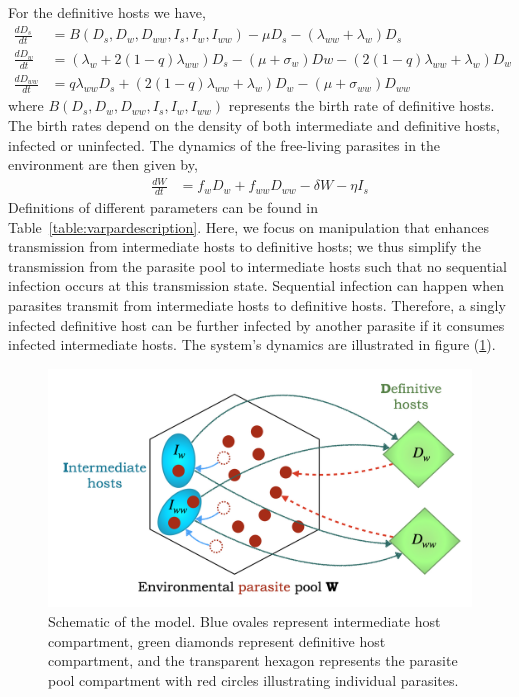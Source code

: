 \documentclass[11pt]{article}
\begin{document}
For the definitive hosts we have,
%
\begin{align}
\frac{dD_s}{dt} &= B(D_s,  D_w,  D_{ww},  I_s, I_w, I_{ww})  - \mu D_s - (\lambda_{ww} + \lambda_w) D_s \nonumber \\    
\frac{dD_w}{dt} &= (\lambda_w + 2 (1 - q) \lambda_{ww}) D_s - (\mu + \sigma_w) Dw - (2 (1 - q) \lambda_{ww} + \lambda_w) D_w  \label{odes:dhosts} \\         
\frac{dD_{ww}}{dt} &= q \lambda_{ww} D_s + (2 (1 - q) \lambda_{ww} + \lambda_w) D_w - (\mu + \sigma_{ww}) D_{ww} \nonumber
\end{align}
%
where $B(D_s, D_w, D_{ww}, I_s, I_w, I_{ww})$ represents the birth rate of definitive hosts.
The birth rates depend on the density of both intermediate and definitive hosts, infected or uninfected. 
The dynamics of the free-living parasites in the environment are then given by,
\begin{align}
	\frac{dW}{dt} &= f_w D_w + f_{ww} D_{ww} - \delta W - \eta I_s \label{odes:eparasite}
\end{align}
%
Definitions of different parameters can be found in Table~\ref{table:varpardescription}.
%
Here, we focus on manipulation that enhances transmission from intermediate hosts to definitive hosts; we thus simplify the transmission from the parasite pool to intermediate hosts such that no sequential infection occurs at this transmission state. 
Sequential infection can happen when parasites transmit from intermediate hosts to definitive hosts. 
Therefore, a singly infected definitive host can be further infected by another parasite if it consumes infected intermediate hosts. 
The system's dynamics are illustrated in figure (\ref{fig:schematic}).
%
\begin{figure}[ht!]
\centering
\includegraphics[width=\textwidth]{Figures/schematic.jpeg}
\caption{Schematic of the model. Blue ovales represent intermediate host compartment, 
green diamonds represent definitive host compartment, 
and the transparent hexagon represents the parasite pool compartment with red circles illustrating individual parasites.
}
\label{fig:schematic}
\end{figure}
\end{document}
